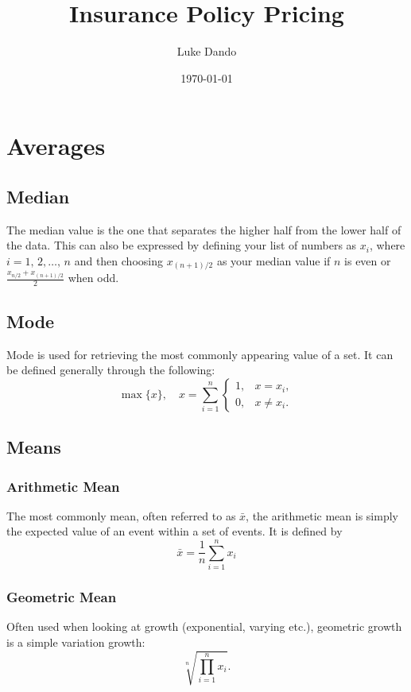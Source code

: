 \documentclass{article}
\title{Insurance Policy Pricing}
\author{Luke Dando}
\date{\today}
\begin{document}
\maketitle
\tableofcontents
\pagebreak
{}

\section{Averages}
\subsection{Median}
The median value is the one that separates the higher half from the lower half of the data. This can also be expressed by defining your list of numbers as ${x_i}$, where $i=1,\,2,\ldots,\,n$ and then choosing $x_{(n+1)/2}$ as your median value if $n$ is even or $\frac{x_{n/2} + x_{(n+1)/2}}{2}$ when odd. 
\subsection{Mode}
Mode is used for retrieving the most commonly appearing value of a set. It can be defined generally through the following:
\begin{equation}
    \max\{x\},\quad x = \sum_{i=1}^n\left\{\begin{matrix} 1, & x = x_i, \\ 0, & x \neq x_i. \end{matrix}\right.
\end{equation}
\subsection{Means}
\subsubsection{Arithmetic Mean}
The most commonly mean, often referred to as $\bar{x}$, the arithmetic mean is simply the expected value of an event within a set of events. It is defined by
\begin{equation}
    \bar{x} = \frac{1}{n}\sum_{i=1}^n x_i
\end{equation}
\subsubsection{Geometric Mean}
Often used when looking at growth (exponential, varying etc.), geometric growth is a simple variation growth:
\begin{equation}
    \sqrt[n]{\prod_{i=1}^n x_i}.
\end{equation}
\end{document}
